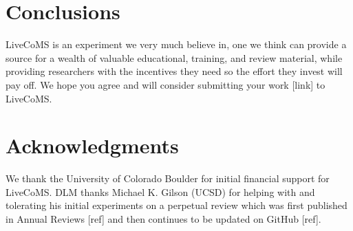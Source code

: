 \documentclass[9pt]{livecoms}
\begin{document}
\section{Conclusions}

LiveCoMS is an experiment we very much believe in, one we think can provide a source for a wealth of valuable educational, training, and review material, while providing researchers with the incentives they need so the effort they invest will pay off.
We hope you agree and will consider submitting your work [link] to LiveCoMS.


\section{Acknowledgments}

We thank the University of Colorado Boulder for initial financial support for LiveCoMS. 
DLM thanks Michael K. Gilson (UCSD) for helping with and tolerating his initial experiments on a perpetual review which was first published in Annual Reviews [ref] and then continues to be updated on GitHub [ref].


\end{document}
